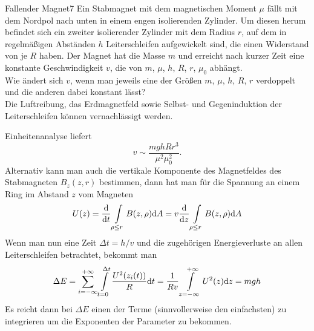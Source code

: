 \begin{problem}{Fallender Magnet}{7}
Ein Stabmagnet mit dem magnetischen Moment $\mu$ fällt mit dem Nordpol nach unten in einem engen isolierenden Zylinder. Um diesen herum befindet sich ein zweiter isolierender Zylinder mit dem Radius $r$, auf dem in regelmäßigen Abständen $h$ Leiterschleifen aufgewickelt sind, die einen Widerstand von je $R$ haben. Der Magnet hat die Masse $m$ und erreicht nach kurzer Zeit eine konstante Geschwindigkeit $v$, die von $m$, $\mu$, $h$, $R$, $r$, $\mu_0$ abhängt.\\
Wie ändert sich $v$, wenn man jeweils eine der Größen $m$, $\mu$, $h$, $R$, $r$ verdoppelt und die anderen dabei konstant lässt?\\
Die Luftreibung, das Erdmagnetfeld sowie Selbst- und Gegeninduktion der Leiterschleifen können vernachlässigt werden.
\begin{solution}
Einheitenanalyse liefert
\[
v \sim \frac{m g h R r^3}{\mu^2 \mu_0^2}.
\]
Alternativ kann man auch die vertikale Komponente des Magnetfeldes des Stabmagneten $B_z(z,r)$ bestimmen, dann hat man für die Spannung an einem Ring im Abstand $z$ vom Magneten
\[
U(z) = \frac{\mathrm{d}}{\mathrm{d} t} \int\limits_{\rho \leq r} B(z,\rho) \mathrm{d} A = v \frac{\mathrm{d}}{\mathrm{d} z} \int\limits_{\rho \leq r} B(z,\rho) \mathrm{d} A
\]
Wenn man nun eine Zeit $\Delta t = h/v$ und die zugehörigen Energieverluste an allen Leiterschleifen betrachtet, bekommt man
\[
\Delta E = \sum_{i=-\infty}^{+\infty} \int\limits_{t=0}^{\Delta t} \frac{U^2(z_i(t))}{R} \mathrm{d} t
= \frac{1}{Rv} \int\limits_{z=-\infty}^{+\infty} U^2(z) \mathrm{d} z = mgh
\]
Es reicht dann bei $\Delta E$ einen der Terme (sinnvollerweise den einfachsten) zu integrieren um die Exponenten der Parameter zu bekommen.
\end{solution}
\end{problem}

